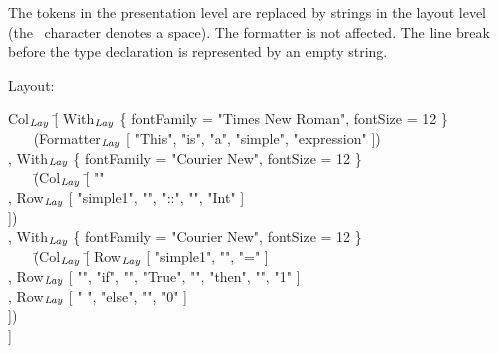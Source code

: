 \documentclass{speauth}
\begin{document}


 The tokens in the presentation level are replaced by strings in the layout level (the \textvisiblespace~character denotes a space). The formatter is not affected. The line break before the type declaration is represented by an empty string. 

Layout:
\small \ttfamily
\begin{tabbing}
Col$_{\mathit{Lay}}$ \= [  With$_{\mathit{Lay}}$ \{ fontFamily = "Times New Roman", fontSize = 12 \}\\
                    \>  ~~~ (Formatter$_{\mathit{Lay}}$ [ "This", "is", "a", "simple", "expression" ])\\
                    \> , With$_{\mathit{Lay}}$ \{ fontFamily = "Courier New",  fontSize = 12 \}\\
                    \>  ~~~ \= (Col$_{\mathit{Lay}}$ \= [ "" \\
                    \>          \>        \> , Row$_{\mathit{Lay}}$ [ "simple1", "\textvisiblespace", "::",
                                                                           "\textvisiblespace", "Int" ]\\
                    \>          \>        \> ])\\
                    \> , With$_{\mathit{Lay}}$ \{ fontFamily = "Courier New",  fontSize = 12 \}\\
                    \>  ~~~ \= (Col$_{\mathit{Lay}}$ \= [ Row$_{\mathit{Lay}}$ [ "simple1", "\textvisiblespace", "=" ]\\
                    \>          \>        \> , Row$_{\mathit{Lay}}$  [ "\textvisiblespace\textvisiblespace", 
                                                                             "if", "\textvisiblespace", "True", "\textvisiblespace", 
                                                                             "then", "\textvisiblespace", "1" ]\\
                    \>          \>        \> , Row$_{\mathit{Lay}}$ [ "\textvisiblespace\textvisiblespace\textvisiblespace
                                                                             \textvisiblespace\textvisiblespace\textvisiblespace
                                                                             \textvisiblespace\textvisiblespace\textvisiblespace                                                                                         \textvisiblespace ", "else", "\textvisiblespace", "0" ]\\
                    \>          \>        \> ])\\
                    \> ]
\end{tabbing}
\rmfamily \normalsize
\end{document}
